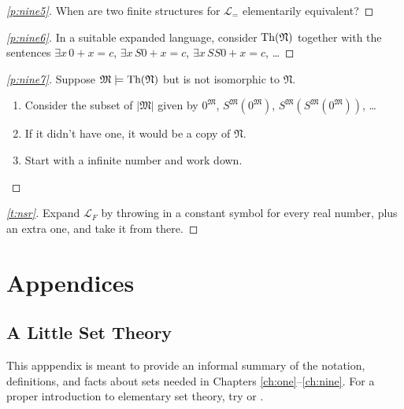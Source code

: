 \documentclass[12pt]{amsbook}
\theoremstyle{plain}
\theoremstyle{definition}
\theoremstyle{remark}
\newenvironment{clue}[1]%
{\begin{proof}[\ref{#1}]}%
{\renewcommand{\qed}{}\end{proof}}
\begin{document}
\begin{clue}{p:nine5}
When are two finite structures for $\mathcal{L}_=$ elementarily equivalent?
\end{clue}

\begin{clue}{p:nine6}
In a suitable expanded language,  consider $\text{\rm Th}(\mathfrak{N})$ together with the sentences $\exists x\, 0 + x =  c$,  $\exists x\, S0 + x =  c$,  $\exists x\, SS0 + x =  c$,  \dots
\end{clue}

\begin{clue}{p:nine7}
Suppose $\mathfrak{M} \models \text{\rm Th}(\mathfrak{N})$ but is not isomorphic to $\mathfrak{N}$.
\begin{enumerate}
\item Consider the subset of $|\mathfrak{M}|$ given by $0^{\mathfrak{M}}$,  $S^{\mathfrak{M}}(0^{\mathfrak{M}})$,  $S^{\mathfrak{M}}(S^{\mathfrak{M}}(0^{\mathfrak{M}}))$,  \dots
\item If it didn't have one,  it would be a copy of $\mathfrak{N}$.
\item Start with a infinite number and work down.
\end{enumerate}
\end{clue}

\begin{clue}{t:nsr}
Expand $\mathcal{L}_F$ by throwing in a constant symbol for every real number,  plus an extra one,  and take it from there.
\end{clue}



\part*{Appendices}
\appendix


%
%

\chapter{A Little Set Theory} \label{ap:sets} 

This apppendix is meant to provide an informal summary of the notation,  definitions, and facts about sets needed in Chapters \ref{ch:one}--\ref{ch:nine}.  For a proper introduction to elementary set theory,  try \cite{PH:NST} or \cite{JH:OST}.  
\end{document}
